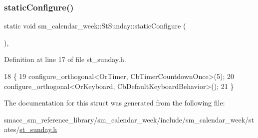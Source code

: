 \subsubsection{\texorpdfstring{static\+Configure()}{staticConfigure()}}
{\footnotesize\ttfamily static void sm\+\_\+calendar\+\_\+week\+::\+St\+Sunday\+::static\+Configure (\begin{DoxyParamCaption}{ }\end{DoxyParamCaption})\hspace{0.3cm}{\ttfamily [inline]}, {\ttfamily [static]}}



Definition at line 17 of file st\+\_\+sunday.\+h.


\begin{DoxyCode}
18     \{
19         configure\_orthogonal<OrTimer,  CbTimerCountdownOnce>(5);   
20         configure\_orthogonal<OrKeyboard, CbDefaultKeyboardBehavior>();
21     \}
\end{DoxyCode}


The documentation for this struct was generated from the following file\+:\begin{DoxyCompactItemize}
\item 
smacc\+\_\+sm\+\_\+reference\+\_\+library/sm\+\_\+calendar\+\_\+week/include/sm\+\_\+calendar\+\_\+week/states/\hyperlink{st__sunday_8h}{st\+\_\+sunday.\+h}\end{DoxyCompactItemize}
